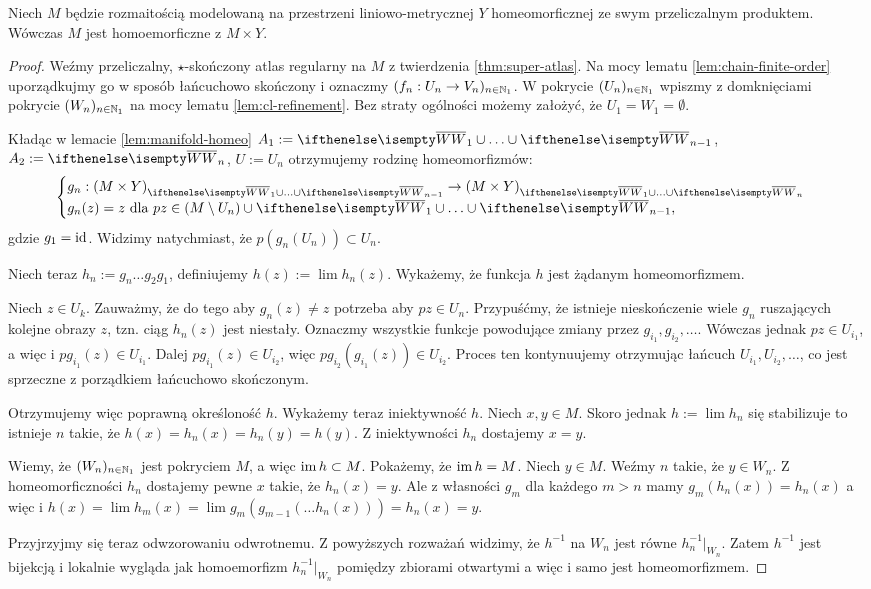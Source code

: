 \begin{thm}
  Niech $M$ będzie rozmaitością modelowaną na przestrzeni liniowo-metrycznej $Y$ homeomorficznej ze swym przeliczalnym produktem. Wówczas $M$ jest homoemorficzne z $M\times Y$.
  
  \begin{proof}
    Weźmy przeliczalny, $\star$-skończony atlas regularny na $M$ z twierdzenia \ref{thm:super-atlas}. Na mocy lematu \ref{lem:chain-finite-order} uporządkujmy go w sposób łańcuchowo skończony i oznaczmy $(f_n: U_n \to V_n)_{n\in{\mathbb{N}_1}}$. W pokrycie $(U_n)_{n\in{\mathbb{N}_1}}$ wpiszmy z domknięciami pokrycie $(W_n)_{n\in{\mathbb{N}_1}}$ na mocy lematu \ref{lem:cl-refinement}. Bez straty ogólności możemy założyć, że $U_1 = W_1 = \emptyset$.
    
    Kładąc w lemacie \ref{lem:manifold-homeo} $A_1 := \cl W_1 \cup\ldots\cup \cl W_{n-1}$, $A_2 := \cl W_{n}$, $U := U_n$ otrzymujemy rodzinę homeomorfizmów:
    \[
      \begin{cases}
        g_n: (M\times Y)_{\cl W_1 \cup\ldots\cup \cl W_{n-1}} \to (M\times Y)_{\cl W_1 \cup\ldots\cup \cl W_n}& \\
        g_n(z) = z\mbox{ dla }pz\in (M\setminus U_n)\cup \cl W_1 \cup\ldots\cup \cl W_{n-1},
      \end{cases}
    \]
    gdzie $g_1 = \operatorname{id}$. Widzimy natychmiast, że $p(g_n(U_n)) \subset U_n$.
    
    Niech teraz $h_n := g_n \ldots g_2 g_1$, definiujemy $h(z) := \lim h_n(z)$. Wykażemy, że funkcja $h$ jest żądanym homeomorfizmem.
    
    Niech $z \in U_k$. Zauważmy, że do tego aby $g_n(z) \neq z$ potrzeba aby $pz \in U_n$. Przypuśćmy, że istnieje nieskończenie wiele $g_n$ ruszających kolejne obrazy $z$, tzn. ciąg $h_n(z)$ jest niestały. Oznaczmy wszystkie funkcje powodujące zmiany przez $g_{i_1}, g_{i_2}, \dots$. Wówczas jednak $pz \in U_{i_1}$, a więc i $p g_{i_1}(z) \in U_{i_1}$. Dalej $p g_{i_1}(z) \in U_{i_2}$, więc $p g_{i_2}(g_{i_1}(z)) \in U_{i_2}$. Proces ten kontynuujemy otrzymując łańcuch $U_{i_1}, U_{i_2}, \dots$, co jest sprzeczne z porządkiem łańcuchowo skończonym.
    
    Otrzymujemy więc poprawną określoność $h$. Wykażemy teraz iniektywność $h$. Niech $x, y \in M$. Skoro jednak $h := \lim h_n$ się stabilizuje to istnieje $n$ takie, że $h(x) = h_n(x) = h_n(y) = h(y)$. Z iniektywności $h_n$ dostajemy $x = y$.
    
    Wiemy, że $(W_n)_{n\in{\mathbb{N}_1}}$ jest pokryciem $M$, a więc $\operatorname{im} h \subset M$. Pokażemy, że $\operatorname{im} h = M$. Niech $y\in M$. Weźmy $n$ takie, że $y\in W_n$. Z homeomorficzności $h_n$ dostajemy pewne $x$ takie, że $h_n(x) = y$. Ale z własności $g_m$ dla każdego $m > n$ mamy $g_m(h_n(x)) = h_n(x)$ a więc i $h(x) = \lim h_m(x) = \lim g_m(g_{m-1}(\dots h_n(x))) = h_n(x) = y$.
    
    Przyjrzyjmy się teraz odwzorowaniu odwrotnemu. Z powyższych rozważań widzimy, że $h^{-1}$ na $W_n$ jest równe $h_n^{-1}|_{W_n}$. Zatem $h^{-1}$ jest bijekcją i lokalnie wygląda jak homoemorfizm $h_n^{-1}|_{W_n}$ pomiędzy zbiorami otwartymi a więc i samo jest homeomorfizmem.
  \end{proof}
\end{thm}

 